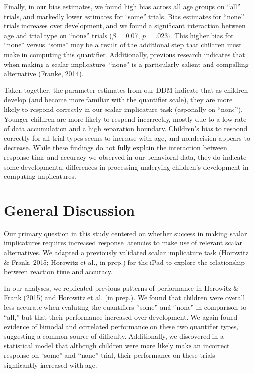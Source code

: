 \documentclass[10pt, letterpaper]{article}
\begin{document}
Finally, in our bias estimates, we found high bias across all age groups
on ``all'' trials, and markedly lower estimates for ``some'' trials.
Bias estimates for ``none'' trials increases over development, and we
found a significant interaction between age and trial type on ``none''
trials (\(\beta\) = 0.07, \(p\) = .023). This higher bias for ``none''
versus ``some'' may be a result of the additional step that children
must make in computing this quantifier. Additionally, previous research
indicates that when making a scalar implicature, ``none'' is a
particularly salient and compelling alternative (Franke, 2014).

Taken together, the parameter estimates from our DDM indicate that as
children develop (and become more familiar with the quantifier scale),
they are more likely to respond correctly in our scalar implicature task
(especially on ``none''). Younger children are more likely to respond
incorrectly, mostly due to a low rate of data accumulation and a high
separation boundary. Children's bias to respond correctly for all trial
types seems to increase with age, and nondecision appears to decrease.
While these findings do not fully explain the interaction between
response time and accuracy we observed in our behavioral data, they do
indicate some developmental differences in processing underying
children's development in computing implicatures.

\section{General Discussion}\label{general-discussion}

Our primary question in this study centered on whether success in making
scalar implicatures requires increased response latencies to make use of
relevant scalar alternatives. We adapted a previously validated scalar
implicature task (Horowitz \& Frank, 2015; Horowitz et al., in prep.)
for the iPad to explore the relationship between reaction time and
accuracy.

In our analyses, we replicated previous patterns of performance in
Horowitz \& Frank (2015) and Horowitz et al. (in prep.). We found that
children were overall less accurate when evaluting the quantifiers
``some'' and ``none'' in comparison to ``all,'' but that their
performance increased over development. We again found evidence of
bimodal and correlated performance on these two quantifier types,
suggesting a common source of difficulty. Additionally, we discovered in
a statistical model that although children were more likely make an
incorrect response on ``some'' and ``none'' trial, their performance on
these trials signficantly increased with age.
\end{document}
